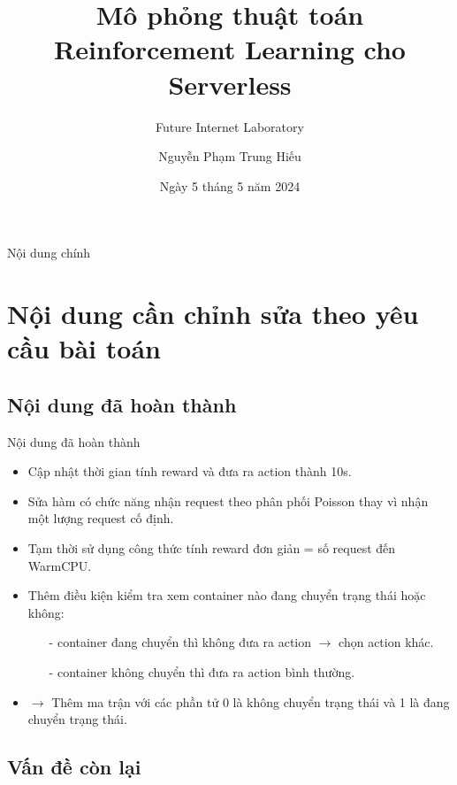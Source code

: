 \documentclass[10pt,aspectratio=169]{beamer}
\title{Mô phỏng thuật toán Reinforcement Learning cho Serverless}
\subtitle{Future Internet Laboratory}
\author{Nguyễn Phạm Trung Hiếu}
\date{Ngày 5 tháng 5 năm 2024}
\begin{document}
\maketitle

\begingroup
    \begin{frame}{Nội dung chính}{}
        \tableofcontents
    \end{frame}
\endgroup

\section{Nội dung cần chỉnh sửa theo yêu cầu bài toán}

\subsection{Nội dung đã hoàn thành}

\begin{frame}{Nội dung đã hoàn thành}{\secname}
\begin{itemize}
\setlength\itemsep{8pt}
\item Cập nhật thời gian tính reward và đưa ra action thành 10s.
\item Sửa hàm  có chức năng nhận request theo phân phối Poisson thay vì nhận một lượng request cố định.
\item Tạm thời sử dụng công thức tính reward đơn giản = số request đến WarmCPU.
\item Thêm điều kiện kiểm tra xem container nào đang chuyển trạng thái hoặc không:
\begin{itemize}
\setlength\itemsep{4pt}
\item[-] container đang chuyển thì không đưa ra action $ \rightarrow $ chọn action khác.
\item[-] container không chuyển thì đưa ra action bình thường.
\end{itemize}
\item[] $ \longrightarrow $ Thêm ma trận  với các phần tử 0 là không chuyển trạng thái và 1 là đang chuyển trạng thái.
\end{itemize}
\end{frame}

\subsection{Vấn đề còn lại}
\end{document}
